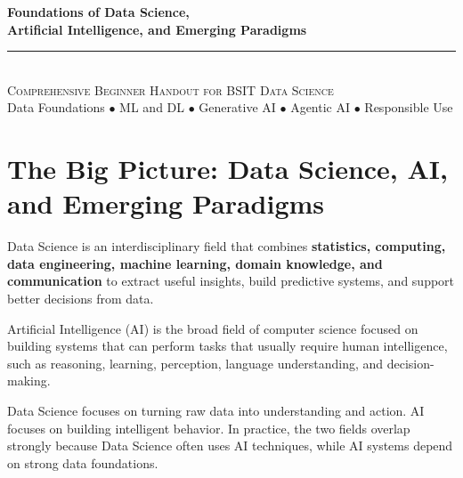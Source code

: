 \documentclass[11pt,a4paper]{article}
\begin{document}
\begin{center}
\vspace*{0.5cm}
{\Huge\bfseries\textcolor{primary}{Foundations of Data Science,}}\\[4pt]
{\Huge\bfseries\textcolor{primary}{Artificial Intelligence, and Emerging Paradigms}}\\[16pt]
{\color{secondary}\rule{0.8\textwidth}{1.5pt}}\\[14pt]
{\Large\textsc{Comprehensive Beginner Handout for BSIT Data Science}}\\[8pt]
{\large\textcolor{gray!70!black}{Data Foundations $\bullet$ ML and DL $\bullet$ Generative AI $\bullet$ Agentic AI $\bullet$ Responsible Use}}
\vspace{0.3cm}
\end{center}

\tableofcontents
\newpage

\section{The Big Picture: Data Science, AI, and Emerging Paradigms}

\begin{definitionbox}
Data Science is an interdisciplinary field that combines \textbf{statistics, computing, data engineering, machine learning, domain knowledge, and communication} to extract useful insights, build predictive systems, and support better decisions from data.
\end{definitionbox}

\begin{definitionbox}
Artificial Intelligence (AI) is the broad field of computer science focused on building systems that can perform tasks that usually require human intelligence, such as reasoning, learning, perception, language understanding, and decision-making.
\end{definitionbox}

\begin{conceptbox}
Data Science focuses on turning raw data into understanding and action. AI focuses on building intelligent behavior. In practice, the two fields overlap strongly because Data Science often uses AI techniques, while AI systems depend on strong data foundations.
\end{conceptbox}
\end{document}
